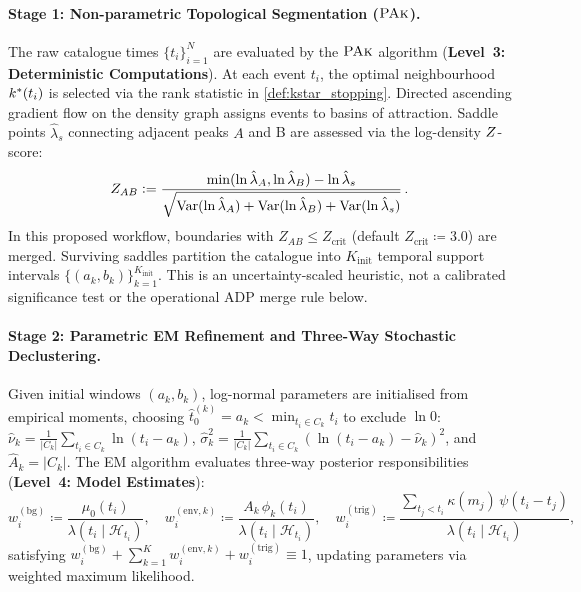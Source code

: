 \paragraph{Stage 1: Non-parametric Topological Segmentation ($\textsc{PAk}$).}
The raw catalogue times $\{t_i\}_{i=1}^N$ are evaluated by the
$\textsc{PAk}$ algorithm (\textbf{Level~3: Deterministic Computations}). At
each event $t_i$, the optimal neighbourhood $k^{*}(t_i)$ is
selected via the rank statistic in \cref{def:kstar_stopping}.
Directed ascending
gradient flow on the density graph assigns events to basins of
attraction. Saddle points $\hat{\lambda}_s$ connecting adjacent
peaks $A$ and B are assessed via the log-density $Z$-score:
\begin{equation}
  Z_{AB} \mathrel{\mathop:}= \frac{\min(\ln \hat{\lambda}_A, \ln \hat{\lambda}_B) -
  \ln \hat{\lambda}_s}{\sqrt{\operatorname{Var}(\ln \hat{\lambda}_A) + \operatorname{Var}(\ln
  \hat{\lambda}_B) + \operatorname{Var}(\ln \hat{\lambda}_s)}}\,.
  \label{eq:zscore_topology}
\end{equation}
In this proposed workflow, boundaries with $Z_{AB}\le Z_{\mathrm{crit}}$
(default $Z_{\mathrm{crit}} \coloneqq \num{3.0}$) are merged. Surviving saddles
partition the catalogue into $K_{\mathrm{init}}$ temporal support
intervals $\{(a_k, b_k)\}_{k=1}^{K_{\mathrm{init}}}$. This is an
uncertainty-scaled heuristic, not a calibrated significance test or
the operational ADP merge rule below.

\paragraph{Stage 2: Parametric EM Refinement and Three-Way
Stochastic Declustering.}
Given initial windows $(a_k, b_k)$, log-normal parameters are
initialised from empirical moments, choosing
$\hat t_0^{(k)}=a_k<\min_{t_i\in C_k}t_i$ to exclude $\ln0$:
$\hat{\nu}_k = \frac{1}{|C_k|}\sum_{t_i \in C_k}\ln(t_i - a_k)$,
$\hat{\sigma}_k^2 = \frac{1}{|C_k|}\sum_{t_i \in C_k}(\ln(t_i - a_k)
- \hat{\nu}_k)^2$, and $\hat{A}_k = |C_k|$. The \ac{EM} algorithm
evaluates three-way posterior responsibilities (\textbf{Level~4:
Model Estimates}):
\begin{equation}
  w_i^{(\mathrm{bg})} \coloneqq \frac{\mu_0(t_i)}{\lambda(t_i \mid
  \mathcal{H}_{t_i})}, \quad
  w_i^{(\mathrm{env}, k)} \coloneqq \frac{A_k\,\phi_k(t_i)}{\lambda(t_i \mid
  \mathcal{H}_{t_i})}, \quad
  w_i^{(\mathrm{trig})} \coloneqq \frac{\sum_{t_j <
  t_i}\kappa(m_j)\,\psi(t_i - t_j)}{\lambda(t_i \mid \mathcal{H}_{t_i})},
  \label{eq:three_way_responsibilities}
\end{equation}
satisfying $w_i^{(\mathrm{bg})} + \sum_{k=1}^K w_i^{(\mathrm{env},
k)} + w_i^{(\mathrm{trig})} \equiv 1$, updating parameters via
weighted maximum likelihood.

